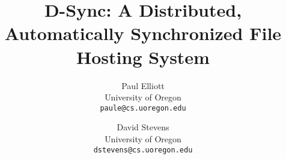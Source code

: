 \documentclass[conference,10pt]{IEEEtran}
\date{}
\begin{document}
\setcounter{page}{1}
\pagestyle{plain}


\title{D-Sync: A Distributed, Automatically Synchronized File Hosting System} 
\author{
{Paul Elliott}\\
University of Oregon\\
\texttt{paule@cs.uoregon.edu}
\and
{David Stevens}\\
University of Oregon\\
\texttt{dstevens@cs.uoregon.edu}
}

\maketitle










\end{document}
